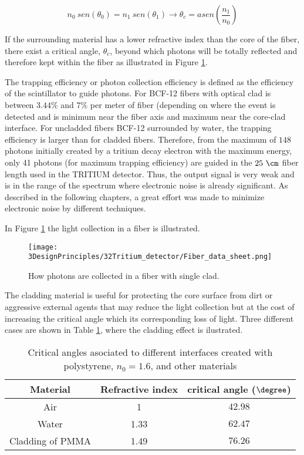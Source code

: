 \begin{equation}
n_0~sen(\theta_0) = n_1~sen(\theta_1) \longrightarrow \theta_c = asen\left(\frac{n_1}{n_0} \right)
\label{eq:Snell}
\end{equation}

If the surrounding material has a lower refractive index than the core of the fiber, there exist a critical angle, $\theta_c$, beyond which photons will be totally reflected and therefore kept within the fiber as illustrated in Figure \ref{fig:Fiber_physic}.

The trapping efficiency or photon collection efficiency is defined as the efficiency of the scintillator to guide photons. For BCF-12 fibers with optical clad is between $3.44\%$ and $7\%$ per meter of fiber (depending on where the event is detected and is minimum near the fiber axis  and maximum near the core-clad interface. For uncladded fibers BCF-12 surrounded by water, the trapping efficiency is larger than for cladded fibers. Therefore, from the maximum of $148$ photons initially created by a tritium decay electron with the maximum energy, only 41 photons (for maximum trapping efficiency) are guided in the $25~\cm$ fiber length used in the TRITIUM detector. Thus, the output signal is very weak and is in the range of the spectrum where electronic noise is already significant. As described in the following chapters, a great effort was made to minimize electronic noise by different techniques.

In Figure \ref{fig:Fiber_physic} the light collection in a fiber is illustrated.

\begin{figure}[htbp]
\centering
\texttt{[image: 3DesignPrinciples/32Tritium\_detector/Fiber\_data\_sheet.png]}
\caption{How photons are collected in a fiber with single clad.\label{fig:Fiber_physic}~\cite{DataSheetBCF12Fiber}}
\end{figure}

The cladding material is useful for protecting the core surface from dirt or aggressive external agents that may reduce the light collection but at the cost of increasing the critical angle which its corresponding loss of light. Three different cases are shown in Table \ref{tab:CriticalAngles}, where the cladding effect is ilustrated.

\begin{table}[htbp]
\begin{center}
\begin{tabular}{|c|c|c|}
\hline
Material & Refractive index & critical angle ($\degree$) \\
\hline \hline \hline
Air & 1 & $42.98$ \\ \hline
Water & 1.33 & $62.47$ \\ \hline
Cladding of PMMA & 1.49 & $76.26$ \\ \hline
\end{tabular}
\caption{Critical angles asociated to different interfaces created with polystyrene, $n_0=1.6$, and other materials}
\label{tab:CriticalAngles}
\end{center}
\end{table}

